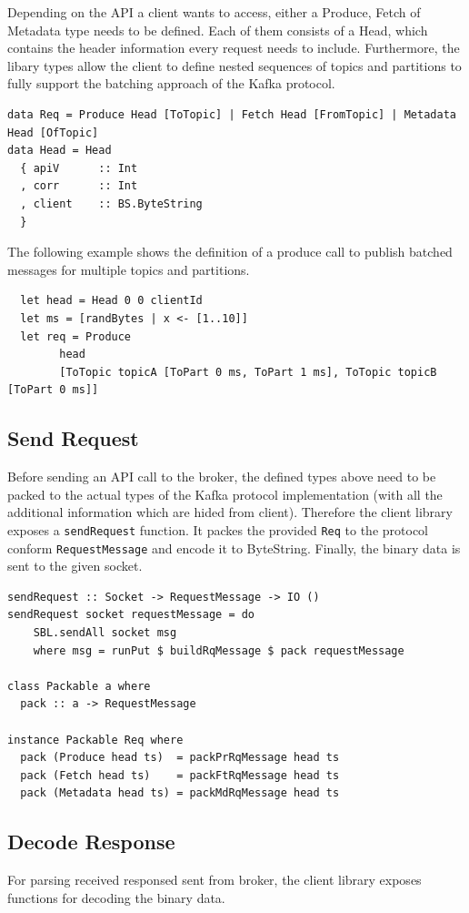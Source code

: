 Depending on the API a client wants to access, either a Produce, Fetch of
Metadata type needs to be defined. Each of them consists of a Head, which
contains the header information every request needs to include. Furthermore, the
libary types allow the client to define nested sequences of topics and
partitions to fully support the batching approach of the Kafka protocol. 
\begin{lstlisting}
data Req = Produce Head [ToTopic] | Fetch Head [FromTopic] | Metadata Head [OfTopic]
data Head = Head
  { apiV      :: Int
  , corr      :: Int
  , client    :: BS.ByteString
  }
\end{lstlisting}

The following example shows the definition of a produce call to publish batched messages
for multiple topics and partitions. 

\begin{lstlisting}
  let head = Head 0 0 clientId
  let ms = [randBytes | x <- [1..10]]
  let req = Produce 
        head 
        [ToTopic topicA [ToPart 0 ms, ToPart 1 ms], ToTopic topicB [ToPart 0 ms]]
\end{lstlisting}

\subsection{Send Request}
Before sending an API call to the broker, the defined types above need to be
packed to the actual types of the Kafka protocol implementation (with all the
additional information which are hided from client). Therefore the client
library exposes a \lstinline{sendRequest} function. It packes the provided
\lstinline{Req} to the protocol conform \lstinline{RequestMessage} and encode it
to ByteString. Finally, the binary data is sent to the given socket.

\begin{lstlisting}
sendRequest :: Socket -> RequestMessage -> IO ()
sendRequest socket requestMessage = do
    SBL.sendAll socket msg
    where msg = runPut $ buildRqMessage $ pack requestMessage

class Packable a where
  pack :: a -> RequestMessage

instance Packable Req where
  pack (Produce head ts)  = packPrRqMessage head ts
  pack (Fetch head ts)    = packFtRqMessage head ts
  pack (Metadata head ts) = packMdRqMessage head ts

\end{lstlisting}

\subsection{Decode Response}
For parsing received responsed sent from broker, the client library exposes
functions for decoding the binary data. 

